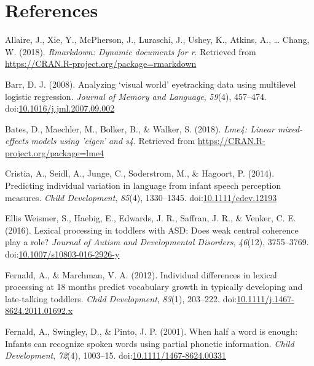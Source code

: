\documentclass [11pt, proquest] {uwthesis}[2015/03/03]
\begin{document}
\chapter*{References}\label{references}


\hypertarget{refs}{}
\hypertarget{ref-R-rmarkdown}{}
Allaire, J., Xie, Y., McPherson, J., Luraschi, J., Ushey, K., Atkins,
A., \ldots{} Chang, W. (2018). \emph{Rmarkdown: Dynamic documents for
r}. Retrieved from \url{https://CRAN.R-project.org/package=rmarkdown}

\hypertarget{ref-Barr2008}{}
Barr, D. J. (2008). Analyzing `visual world' eyetracking data using
multilevel logistic regression. \emph{Journal of Memory and Language},
\emph{59}(4), 457--474.
doi:\href{https://doi.org/10.1016/j.jml.2007.09.002}{10.1016/j.jml.2007.09.002}

\hypertarget{ref-R-lme4}{}
Bates, D., Maechler, M., Bolker, B., \& Walker, S. (2018). \emph{Lme4:
Linear mixed-effects models using 'eigen' and s4}. Retrieved from
\url{https://CRAN.R-project.org/package=lme4}

\hypertarget{ref-Cristia2014_Review}{}
Cristia, A., Seidl, A., Junge, C., Soderstrom, M., \& Hagoort, P.
(2014). Predicting individual variation in language from infant speech
perception measures. \emph{Child Development}, \emph{85}(4), 1330--1345.
doi:\href{https://doi.org/10.1111/cdev.12193}{10.1111/cdev.12193}

\hypertarget{ref-EllisWeismer2016}{}
Ellis Weismer, S., Haebig, E., Edwards, J. R., Saffran, J. R., \&
Venker, C. E. (2016). Lexical processing in toddlers with ASD: Does weak
central coherence play a role? \emph{Journal of Autism and Developmental
Disorders}, \emph{46}(12), 3755--3769.
doi:\href{https://doi.org/10.1007/s10803-016-2926-y}{10.1007/s10803-016-2926-y}

\hypertarget{ref-Fernald2012}{}
Fernald, A., \& Marchman, V. A. (2012). Individual differences in
lexical processing at 18 months predict vocabulary growth in typically
developing and late-talking toddlers. \emph{Child Development},
\emph{83}(1), 203--222.
doi:\href{https://doi.org/10.1111/j.1467-8624.2011.01692.x}{10.1111/j.1467-8624.2011.01692.x}

\hypertarget{ref-Fernald2001}{}
Fernald, A., Swingley, D., \& Pinto, J. P. (2001). When half a word is
enough: Infants can recognize spoken words using partial phonetic
information. \emph{Child Development}, \emph{72}(4), 1003--15.
doi:\href{https://doi.org/10.1111/1467-8624.00331}{10.1111/1467-8624.00331}
\end{document}
